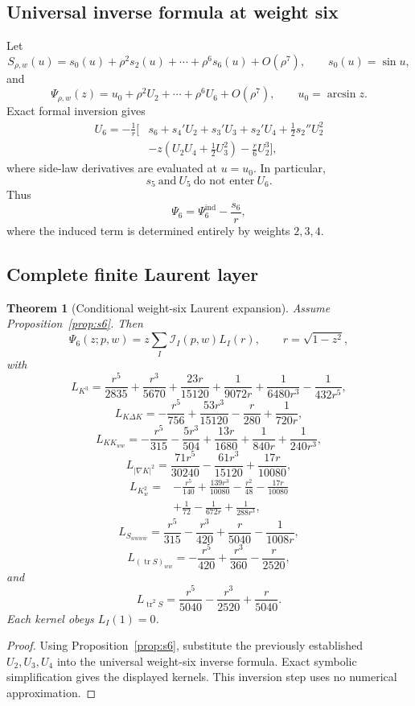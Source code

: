 \documentclass[11pt]{article}
\newtheorem{theorem}{Theorem}[section]
\theoremstyle{definition}
\theoremstyle{remark}
\newcommand{\cI}{\mathcal{I}}
\newcommand{\tr}{\operatorname{tr}}
\begin{document}
\subsection{Universal inverse formula at weight six}

Let
\[
S_{\rho,w}(u)
=
s_0(u)+\rho^2s_2(u)+\cdots+\rho^6s_6(u)+O(\rho^7),
\qquad s_0(u)=\sin u,
\]
and
\[
\Psi_{\rho,w}(z)
=
u_0+\rho^2U_2+\cdots+\rho^6U_6+O(\rho^7),
\qquad u_0=\arcsin z.
\]
Exact formal inversion gives
\[
\begin{aligned}
U_6=-\frac1r\Bigg[
&s_6+s_4'U_2+s_3'U_3+s_2'U_4+\frac12s_2''U_2^2
\\
&-z\left(U_2U_4+\frac12U_3^2\right)-\frac r6U_2^3
\Bigg],
\end{aligned}
\]
where side-law derivatives are evaluated at \(u=u_0\).  In particular,
\[
\boxed{s_5\ \text{and}\ U_5\ \text{do not enter}\ U_6.}
\]
Thus
\[
\Psi_6=\Psi_6^{\mathrm{ind}}-\frac{s_6}{r},
\]
where the induced term is determined entirely by weights \(2,3,4\).

\subsection{Complete finite Laurent layer}

\begin{theorem}[Conditional weight-six Laurent expansion]
\label{thm:weight-six-laurent}
Assume Proposition~\ref{prop:s6}.  Then
\[
\boxed{
\Psi_6(z;p,w)
=
z\sum_I\cI_I(p,w)L_I(r),
\qquad r=\sqrt{1-z^2},
}
\]
with
\[
L_{K^3}
=
\frac{r^5}{2835}+\frac{r^3}{5670}+\frac{23r}{15120}
+\frac1{9072r}+\frac1{6480r^3}-\frac1{432r^5},
\]
\[
L_{K\Delta K}
=
-\frac{r^5}{756}+\frac{53r^3}{15120}-\frac r{280}+\frac1{720r},
\]
\[
L_{KK_{ww}}
=
-\frac{r^5}{315}-\frac{5r^3}{504}+\frac{13r}{1680}
+\frac1{840r}+\frac1{240r^3},
\]
\[
L_{|\nabla K|^2}
=
\frac{71r^5}{30240}-\frac{61r^3}{15120}+\frac{17r}{10080},
\]
\[
\begin{aligned}
L_{K_w^2}
={}&
-\frac{r^5}{140}+\frac{139r^3}{10080}-\frac{r^2}{48}
-\frac{17r}{10080}
\\
&+\frac1{72}-\frac1{672r}+\frac1{288r^3},
\end{aligned}
\]
\[
L_{S_{wwww}}
=
\frac{r^5}{315}-\frac{r^3}{420}+\frac r{5040}-\frac1{1008r},
\]
\[
L_{(\tr S)_{ww}}
=
-\frac{r^5}{420}+\frac{r^3}{360}-\frac r{2520},
\]
and
\[
L_{\tr^2S}
=
\frac{r^5}{5040}-\frac{r^3}{2520}+\frac r{5040}.
\]
Each kernel obeys \(L_I(1)=0\).
\end{theorem}

\begin{proof}
Using Proposition~\ref{prop:s6}, substitute the previously established
\(U_2,U_3,U_4\) into the universal weight-six inverse formula.  Exact symbolic
simplification gives the displayed kernels.  This inversion step uses no
numerical approximation.
\end{proof}
\end{document}

